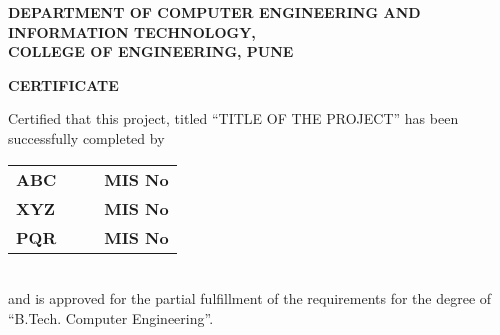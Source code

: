 % 
\thispagestyle{empty}
\linespread{2}
\begin{center}			%
	\Large{\bf{DEPARTMENT OF COMPUTER ENGINEERING AND\\  INFORMATION TECHNOLOGY,\\ 
	       COLLEGE OF ENGINEERING, PUNE\\}}	
\end{center}

\vspace{20pt}			%

\begin{center}
	\Large{\bf{CERTIFICATE\\}}
\end{center}

\vspace{20pt}

\linespread{1.5}			%
\selectfont
\large{
Certified that this project, titled ``TITLE OF THE PROJECT''
has been successfully completed by \\ 
\begin{table}[htbp]
	\begin{center}
	\begin{tabular}{ l c c l }
	\Large\bf{ABC} & & & \Large\bf{MIS No} \\ [0.3cm]
	\Large\bf{XYZ} & & & \Large\bf{MIS No} \\ [0.3cm]
	\Large\bf{PQR} & & & \Large\bf{MIS No} \\
	\end{tabular}
	\end{center}
	\end{table} \\
and is approved for the partial fulfillment of the requirements for the degree of 
``B.Tech. Computer Engineering''.
}

\vspace{60pt}

